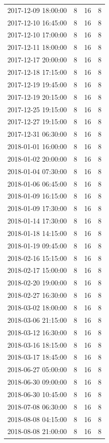 \begin{tabular}{lrrr}
2017-12-09 18:00:00 & 8 & 16 & 8 \\
2017-12-10 16:45:00 & 8 & 16 & 8 \\
2017-12-10 17:00:00 & 8 & 16 & 8 \\
2017-12-11 18:00:00 & 8 & 16 & 8 \\
2017-12-17 20:00:00 & 8 & 16 & 8 \\
2017-12-18 17:15:00 & 8 & 16 & 8 \\
2017-12-19 19:45:00 & 8 & 16 & 8 \\
2017-12-19 20:15:00 & 8 & 16 & 8 \\
2017-12-25 19:15:00 & 8 & 16 & 8 \\
2017-12-27 19:15:00 & 8 & 16 & 8 \\
2017-12-31 06:30:00 & 8 & 16 & 8 \\
2018-01-01 16:00:00 & 8 & 16 & 8 \\
2018-01-02 20:00:00 & 8 & 16 & 8 \\
2018-01-04 07:30:00 & 8 & 16 & 8 \\
2018-01-06 06:45:00 & 8 & 16 & 8 \\
2018-01-09 16:15:00 & 8 & 16 & 8 \\
2018-01-09 17:30:00 & 8 & 16 & 8 \\
2018-01-14 17:30:00 & 8 & 16 & 8 \\
2018-01-18 14:15:00 & 8 & 16 & 8 \\
2018-01-19 09:45:00 & 8 & 16 & 8 \\
2018-02-16 15:15:00 & 8 & 16 & 8 \\
2018-02-17 15:00:00 & 8 & 16 & 8 \\
2018-02-20 19:00:00 & 8 & 16 & 8 \\
2018-02-27 16:30:00 & 8 & 16 & 8 \\
2018-03-02 18:00:00 & 8 & 16 & 8 \\
2018-03-06 21:15:00 & 8 & 16 & 8 \\
2018-03-12 16:30:00 & 8 & 16 & 8 \\
2018-03-16 18:15:00 & 8 & 16 & 8 \\
2018-03-17 18:45:00 & 8 & 16 & 8 \\
2018-06-27 05:00:00 & 8 & 16 & 8 \\
2018-06-30 09:00:00 & 8 & 16 & 8 \\
2018-06-30 10:45:00 & 8 & 16 & 8 \\
2018-07-08 06:30:00 & 8 & 16 & 8 \\
2018-08-08 04:15:00 & 8 & 16 & 8 \\
2018-08-08 21:00:00 & 8 & 16 & 8 \\

\end{tabular}
